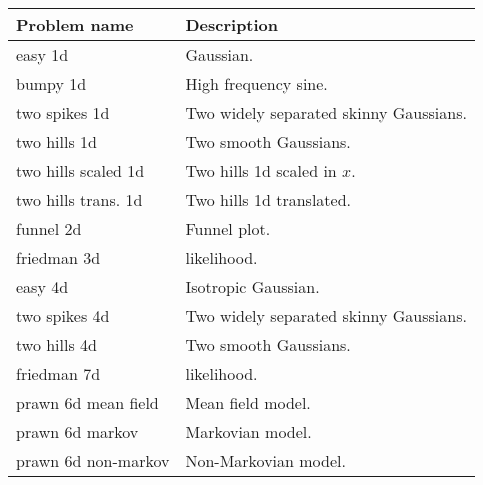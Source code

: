 \begin{table}[h!]
\label{tbl:problem_descriptions}
\begin{center}
\begin{tabular}{lp{4cm}}
 Problem name & Description \ 
 \\ \midrule 
easy 1d & Gaussian. \\ 
bumpy 1d & High frequency sine. \\ 
two spikes 1d & Two widely separated skinny Gaussians. \\ 
two hills 1d & Two smooth Gaussians. \\ 
two hills scaled 1d & Two hills 1d scaled in $x$. \\ 
two hills trans. 1d & Two hills 1d translated. \\ 
funnel 2d & Funnel plot.  \\ 
friedman 3d & \gpb likelihood. \\ 
easy 4d & Isotropic Gaussian. \\ 
two spikes 4d & Two widely separated skinny Gaussians. \\ 
two hills 4d & Two smooth Gaussians. \\ 
friedman 7d & \gpb likelihood. \\ 
prawn 6d mean field & Mean field model. \\ 
prawn 6d markov & Markovian model. \\ 
prawn 6d non-markov & Non-Markovian model. \\ 
\end{tabular}
\end{center}
\end{table}
